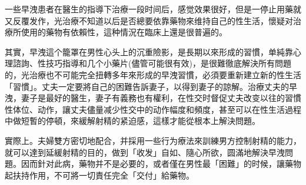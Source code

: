\documentclass[12pt,UTF8]{ctexbook}
\begin{document}
一些早洩患者在醫生的指導下治療一段时间后，感觉效果很好，但是一停止用藥就又反覆发作，光治療不知道以后是否總要依靠藥物來维持自己的性生活，懷疑对治療所使用的藥物有依賴性，這种情況在臨床上還是很普遍的。

其實，早洩這个籠罩在男性心头上的沉重險影，是長期以來形成的習慣，单純靠心理諮詢、性技巧指導和几个小藥片(儘管可能很有效)，是很難徹底解決所有問題的，光治療也不可能完全扭轉多年來形成的早洩習慣，必須要重新建立新的性生活「習慣」。丈夫一定要將自己的困難告訴妻子，以得到妻子的諒解。治療丈夫的早洩，妻子是最好的醫生，妻子有義務也有權利，在性交时督促丈夫改变以往的習慣性体位、动作，讓丈夫儘量减少性交中的动作幅度和頻度，甚至可以在性生活過程中做短暫的停頓，來緩解射精的紧迫感，這樣才能從根本上解決問題。

實際上。夫婦雙方密切地配合，并採用一些行为療法來訓練男方控制射精的能力，就可以達到延緩射精的目的，做到「收发」自如、隨心所欲，圆滿地解決早洩問題。因而針对此病，藥物并不是必要的，或者僅在男性最「困難」的时候，讓藥物起扶持作用，不可將一切責任完全「交付」給藥物。

\backmatter
\end{document}
